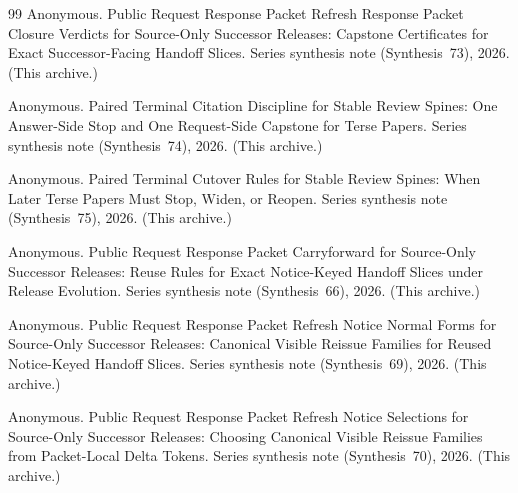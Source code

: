 \documentclass[11pt]{article}
\begin{document}
\begin{thebibliography}{99}
Anonymous.
\newblock Public Request Response Packet Refresh Response Packet Closure Verdicts for Source-Only Successor Releases: Capstone Certificates for Exact Successor-Facing Handoff Slices.
\newblock Series synthesis note (Synthesis~73), 2026. (This archive.)

Anonymous.
\newblock Paired Terminal Citation Discipline for Stable Review Spines: One Answer-Side Stop and One Request-Side Capstone for Terse Papers.
\newblock Series synthesis note (Synthesis~74), 2026. (This archive.)

Anonymous.
\newblock Paired Terminal Cutover Rules for Stable Review Spines: When Later Terse Papers Must Stop, Widen, or Reopen.
\newblock Series synthesis note (Synthesis~75), 2026. (This archive.)



Anonymous.
\newblock Public Request Response Packet Carryforward for Source-Only Successor Releases: Reuse Rules for Exact Notice-Keyed Handoff Slices under Release Evolution.
\newblock Series synthesis note (Synthesis~66), 2026. (This archive.)

Anonymous.
\newblock Public Request Response Packet Refresh Notice Normal Forms for Source-Only Successor Releases: Canonical Visible Reissue Families for Reused Notice-Keyed Handoff Slices.
\newblock Series synthesis note (Synthesis~69), 2026. (This archive.)

Anonymous.
\newblock Public Request Response Packet Refresh Notice Selections for Source-Only Successor Releases: Choosing Canonical Visible Reissue Families from Packet-Local Delta Tokens.
\newblock Series synthesis note (Synthesis~70), 2026. (This archive.)

\end{thebibliography}
\end{document}
